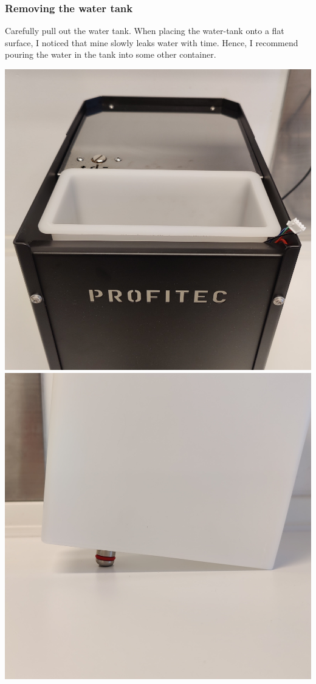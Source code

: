 \documentclass[]{article}
\begin{document}
\subsubsection{Removing the water tank}
\begin{minipage}[t]{0.5\linewidth}
	\vspace{0pt}
	Carefully pull out the water tank. When placing the water-tank onto a flat surface, I noticed that mine slowly leaks water with time. Hence, I recommend pouring the water in the tank into some other container.
\end{minipage}
\hfill
\begin{minipage}[t]{0.4\linewidth}
	\vspace{0pt}
	\includegraphics[width=\linewidth]{images/03_installation/02_remove_watertank.jpg}
	\includegraphics[width=\linewidth]{images/03_installation/03_warning_leak.jpg}
\end{minipage}
\end{document}
